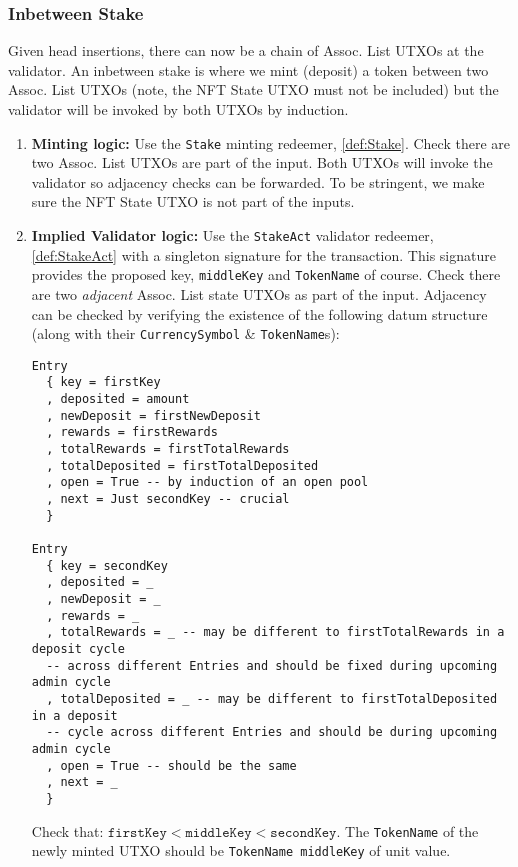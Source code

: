 \documentclass[10pt, a4paper]{article}
\theoremstyle{definition}
\begin{document}
\subsubsection{Inbetween Stake}\label{subsubsection:InbetweenStake}
Given head insertions, there can now be a chain of Assoc. List  UTXOs at the validator. An inbetween stake is where we mint (deposit) a token between two Assoc. List UTXOs (note, the NFT State UTXO must not be included) but the validator will be invoked by both UTXOs by induction.
\begin{enumerate}
\item{\textbf{Minting logic:} Use the \texttt{Stake} minting redeemer, \ref{def:Stake}. Check there are two Assoc. List UTXOs are part of the input. Both UTXOs will invoke the validator so adjacency checks can be forwarded. To be stringent, we make sure the NFT State UTXO is not part of the inputs.
}

\item{\textbf{Implied Validator logic:} Use the \texttt{StakeAct} validator redeemer, \ref{def:StakeAct} with a singleton signature for the transaction. This signature provides the proposed key, \texttt{middleKey} and \texttt{TokenName} of course. Check there are two \textit{adjacent} Assoc. List state UTXOs as part of the input. Adjacency can be checked by verifying the existence of the following datum structure (along with their \texttt{CurrencySymbol} \& \texttt{TokenName}s):
\begin{verbatim}
Entry
  { key = firstKey
  , deposited = amount
  , newDeposit = firstNewDeposit
  , rewards = firstRewards
  , totalRewards = firstTotalRewards
  , totalDeposited = firstTotalDeposited
  , open = True -- by induction of an open pool
  , next = Just secondKey -- crucial
  }

Entry
  { key = secondKey
  , deposited = _
  , newDeposit = _
  , rewards = _
  , totalRewards = _ -- may be different to firstTotalRewards in a deposit cycle
  -- across different Entries and should be fixed during upcoming admin cycle
  , totalDeposited = _ -- may be different to firstTotalDeposited in a deposit
  -- cycle across different Entries and should be during upcoming admin cycle
  , open = True -- should be the same
  , next = _
  }
\end{verbatim}

Check that:  $\texttt{firstKey} < \texttt{middleKey} < \texttt{secondKey}.$ The \texttt{TokenName} of the newly minted UTXO should be \texttt{TokenName middleKey} of unit value.

}
\end{enumerate}
\end{document}
